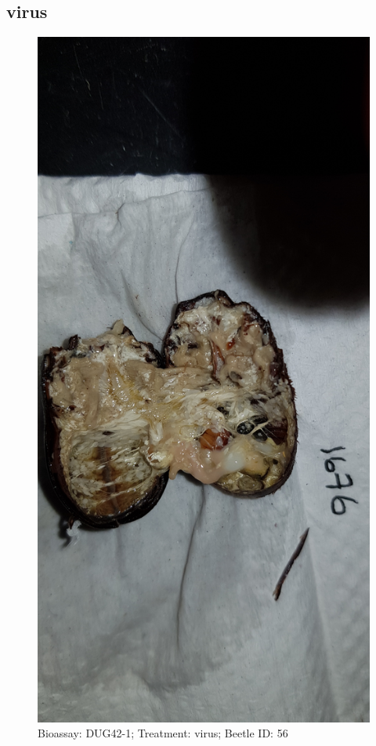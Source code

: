 \documentclass[11pt]{scrartcl}
\begin{document}
\subsection{virus}

\begin{figure}[h!]
    \centering
    \includegraphics[width=\linewidth, height=\textheight, keepaspectratio]{uploads/btl.pm_image.b3bd14df70606ca8.447567343220313637365f5265702d312076697275732e6a7067.jpg}
    \caption{Bioassay: DUG42-1; Treatment: virus; Beetle ID: 56}
\end{figure}
\clearpage
\end{document}
